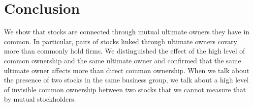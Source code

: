 \section{Conclusion}

	We show that stocks are connected through mutual ultimate owners they have in common. In particular, pairs of stocks linked through ultimate owners covary more than commonly hold firms. We distinguished the effect of the high level of common ownership and the same ultimate owner and confirmed that the same ultimate owner affects more than direct common ownership.
	When we talk about the presence of two stocks in the same business group, we talk about a high level of invisible common ownership between two stocks that we cannot measure that by mutual stockholders.

	


\newpage
	{
	\footnotesize
		
		
	}





